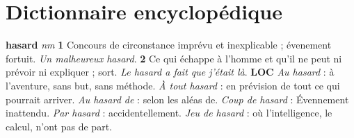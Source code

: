 
\section{Dictionnaire encyclopédique}

{\bf hasard} {\it nm} {\bf 1} Concours de circonstance imprévu et inexplicable ; évenement fortuit. {\it Un malheureux hasard}. {\bf 2} Ce qui échappe à l'homme et qu'il ne peut ni prévoir ni expliquer ; sort. {\it Le hasard a fait que j'était là}. {\bf \footnotesize LOC} {\it Au hasard} : à l'aventure, sans but, sans méthode. {\it À tout hasard} : en prévision de tout ce qui pourrait arriver. {\it Au hasard de} : selon les aléas de. {\it Coup de hasard} : Évennement inattendu. {\it Par hasard} : accidentellement. {\it Jeu de hasard} : où l'intelligence, le calcul, n'ont pas de part.
